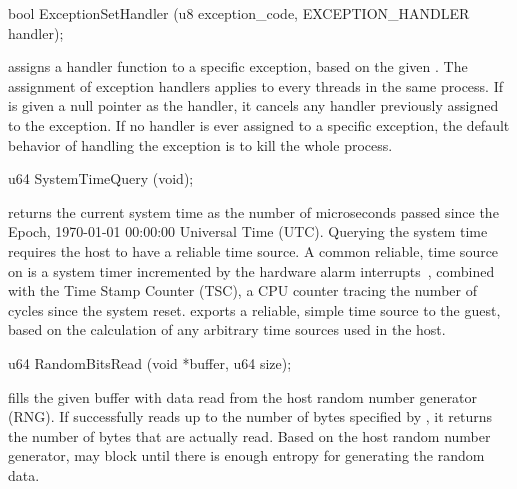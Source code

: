 \begin{paldef}
bool ExceptionSetHandler (u8 exception_code,
                          EXCEPTION_HANDLER handler);
\end{paldef}

 assigns a handler function to a specific exception, based on the given .
The assignment of exception handlers
applies to every threads in the same process.
If  is given a null pointer as the handler,
it cancels any handler previously assigned to the exception.
If no handler is ever assigned to a specific exception,
the default behavior of handling the exception is to kill the whole process.












\begin{paldef}
u64 SystemTimeQuery (void);
\end{paldef}


 returns the current system time as
the number of microseconds passed since the Epoch, 1970-01-01 00:00:00 Universal Time (UTC).
Querying the system time
requires the host to have a reliable time source.
A common reliable, time source on \graphenearch{}
is a system timer incremented by the hardware alarm interrupts~\cite{love10linux-kernel},
combined with the Time Stamp Counter (TSC), a CPU counter tracing the number of cycles since the system reset.
 exports a reliable, simple time source
to the guest, based on the calculation of any arbitrary time sources used in the host.







\begin{paldef}
u64 RandomBitsRead (void *buffer, u64 size);
\end{paldef}


 fills the given buffer with data read from the host random number generator (RNG).
If  successfully reads up to the number of bytes
specified by , it returns the number of bytes that are actually read.
Based on the host random number generator,
 may block until there is enough entropy for generating the random data.


